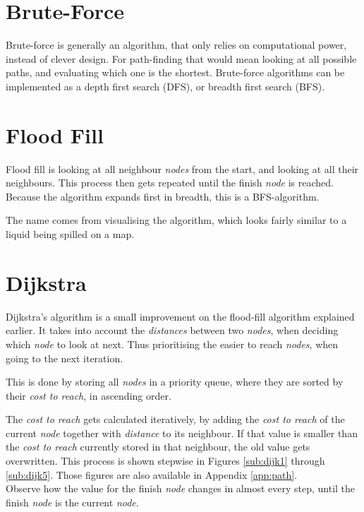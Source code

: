 \section{Brute-Force}\label{sec:brute}
Brute-force is generally an algorithm,
that only relies on computational power,
instead of clever design.
For path-finding that would mean looking at all possible paths,
and evaluating which one is the shortest.
Brute-force algorithms can be implemented as a depth first search (DFS), or breadth first search (BFS).

\section{Flood Fill}\label{sec:fill}
Flood fill is looking at all neighbour \emph{nodes} from the start,
and looking at all their neighbours.
This process then gets repeated until the finish \emph{node} is reached.
Because the algorithm expands first in breadth,
this is a BFS-algorithm.

The name comes from visualising the algorithm,
which looks fairly similar to a liquid being spilled on a map.
\cite{Jaimini2017}

\section{Dijkstra}\label{sec:dijkstra}
Dijkstra's algorithm is a small improvement on the flood-fill algorithm explained earlier.
It takes into account the \emph{distances} between two \emph{nodes},
when deciding which \emph{node} to look at next.
Thus prioritising the easier to reach \emph{nodes}, when going to the next iteration.

This is done by storing all \emph{nodes} in a priority queue,
where they are sorted by their \emph{cost to reach}, in ascending order.

The \emph{cost to reach} gets calculated iteratively,
by adding the \emph{cost to reach} of the current \emph{node} together with \emph{distance} to its neighbour.
If that value is smaller than the \emph{cost to reach} currently stored in that neighbour,
the old value gets overwritten.
This process is shown stepwise in Figures \ref{sub:dijk1} through \ref{sub:dijk5}.
Those figures are also available in Appendix \ref{app:path}.\\
Observe how the value for the finish \emph{node} changes in almost every step,
until the finish \emph{node} is the current \emph{node}.

